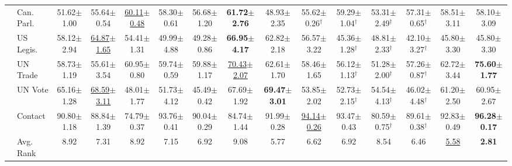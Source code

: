 \begin{table}[t]
{\begin{tabular}{llccccccccccccc}
 & Can. Parl. & 51.62{\scriptsize$\pm$1.00} & 55.64{\scriptsize$\pm$0.54} & \underline{60.11{\scriptsize$\pm$0.48}} & 58.30{\scriptsize$\pm$0.61} & 56.68{\scriptsize$\pm$1.20} & \textbf{61.72{\scriptsize$\pm$2.76}} & 48.93{\scriptsize$\pm$2.35} & 55.62{\scriptsize$\pm$0.26}$^\dagger$ & 59.29{\scriptsize$\pm$1.04}$^\dagger$ & 53.31{\scriptsize$\pm$2.49}$^\dagger$ & 57.31{\scriptsize$\pm$0.65}$^\dagger$ & 58.51{\scriptsize$\pm$3.11} & 58.10{\scriptsize$\pm$3.09} \\
 & US Legis. & 58.12{\scriptsize$\pm$2.94} & \underline{64.87{\scriptsize$\pm$1.65}} & 54.41{\scriptsize$\pm$1.31} & 49.99{\scriptsize$\pm$4.88} & 49.28{\scriptsize$\pm$0.86} & \textbf{66.95{\scriptsize$\pm$4.17}} & 62.82{\scriptsize$\pm$2.18} & 56.57{\scriptsize$\pm$3.22} & 45.36{\scriptsize$\pm$1.28}$^\dagger$ & 48.81{\scriptsize$\pm$2.33}$^\dagger$ & 42.10{\scriptsize$\pm$3.27}$^\dagger$ & 45.80{\scriptsize$\pm$3.30} & 45.80{\scriptsize$\pm$3.30} \\
 & UN Trade & 58.73{\scriptsize$\pm$1.19} & 55.61{\scriptsize$\pm$3.54} & 60.95{\scriptsize$\pm$0.80} & 59.74{\scriptsize$\pm$0.59} & 59.88{\scriptsize$\pm$1.17} & \underline{70.43{\scriptsize$\pm$2.07}} & 62.61{\scriptsize$\pm$1.70} & 58.46{\scriptsize$\pm$1.65} & 56.12{\scriptsize$\pm$1.13}$^\dagger$ & 51.28{\scriptsize$\pm$2.00}$^\dagger$ & 57.26{\scriptsize$\pm$0.87}$^\dagger$ & 62.72{\scriptsize$\pm$3.44} & \textbf{75.60{\scriptsize$\pm$1.77}} \\
 & UN Vote & 65.16{\scriptsize$\pm$1.28} & \underline{68.59{\scriptsize$\pm$3.11}} & 48.01{\scriptsize$\pm$1.77} & 51.73{\scriptsize$\pm$4.12} & 45.49{\scriptsize$\pm$0.42} & 67.69{\scriptsize$\pm$1.92} & \textbf{69.47{\scriptsize$\pm$3.01}} & 53.85{\scriptsize$\pm$2.02} & 52.73{\scriptsize$\pm$2.15}$^\dagger$ & 54.54{\scriptsize$\pm$4.13}$^\dagger$ & 46.02{\scriptsize$\pm$4.48}$^\dagger$ & 61.20{\scriptsize$\pm$2.50} & 60.95{\scriptsize$\pm$2.67} \\
 & Contact & 90.80{\scriptsize$\pm$1.18} & 88.84{\scriptsize$\pm$1.39} & 74.79{\scriptsize$\pm$0.37} & 93.76{\scriptsize$\pm$0.41} & 90.04{\scriptsize$\pm$0.29} & 84.74{\scriptsize$\pm$1.44} & 91.99{\scriptsize$\pm$0.28} & \underline{94.14{\scriptsize$\pm$0.26}} & 93.47{\scriptsize$\pm$0.43} & 80.59{\scriptsize$\pm$0.75}$^\dagger$ & 89.61{\scriptsize$\pm$0.38}$^\dagger$ & 92.83{\scriptsize$\pm$0.49} & \textbf{96.28{\scriptsize$\pm$0.17}} \\
\cmidrule{2-15}
 & Avg. Rank & 8.92 & 7.31 & 8.92 & 7.15 & 6.92 & 9.08 & 5.77 & 6.62 & 6.92 & 8.54 & 6.46 & \underline{5.58} & \textbf{2.81} \\

\end{tabular}}
\end{table}

